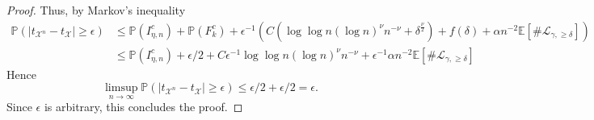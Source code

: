 \documentclass[11pt]{article}
\begin{document}
\begin{proof}
  

  

  
  
  Thus, by Markov's inequality
  \begin{align*}
  \mathbb{P}(  |t_{\mathcal{X}^n}-t_{\mathcal{X}}| \geq \epsilon  )&\leq \mathbb{P}(I_{\eta,n}^c)+ \mathbb{P}(F_k^c) + \epsilon^{-1}(C (\log\log n (\log n)^\nu n^{-\nu}+ \delta^{\frac{\nu}{2}}) +f(\delta)+ \alpha n^{-2}\mathbb{E}[  \#  \mathcal{L}_{\gamma,\geq \delta}])\\
  &\leq  \mathbb{P}(I_{\eta,n}^c)+\epsilon/2+ C\epsilon^{-1} \log\log n (\log n)^\nu n^{-\nu}+ \epsilon^{-1} \alpha n^{-2}\mathbb{E}[  \#  \mathcal{L}_{\gamma,\geq \delta}]
  \end{align*}
  Hence 
  \[
\limsup_{n\to \infty} \mathbb{P}(  |t_{\mathcal{X}^n}-t_{\mathcal{X}}| \geq \epsilon  ) \le \epsilon/2 + \epsilon /2 
 = \epsilon. \]
 Since $\epsilon$ is arbitrary, this concludes the proof.
\end{proof}
\end{document}
